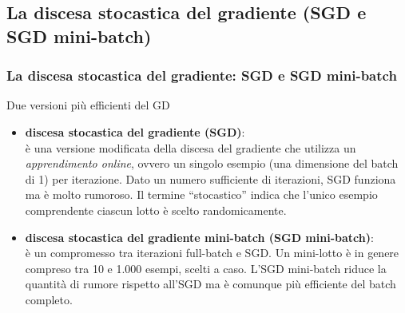 \subsection[La discesa stocastica del gradiente (SGD e SGD mini-batch)]{La discesa stocastica del gradiente (SGD e SGD mini-batch)}
\begin{frame}
	
	\frametitle{La discesa stocastica del gradiente: SGD e SGD mini-batch}
	
	\begin{block}{Due versioni più efficienti del GD} 
	
		\begin{itemize}
			\item \textbf{discesa stocastica del gradiente (SGD)}:\\
				è una versione modificata della discesa del gradiente che utilizza un \textit{apprendimento online}, ovvero un singolo esempio (una dimensione del batch di 1) per iterazione.
				Dato un numero sufficiente di iterazioni, SGD funziona ma è molto rumoroso. Il termine ``stocastico'' indica che l'unico esempio comprendente ciascun lotto è scelto randomicamente.
			\item \textbf{discesa stocastica del gradiente mini-batch (SGD mini-batch)}:\\
				è un compromesso tra iterazioni full-batch e SGD.
				Un mini-lotto è in genere compreso tra 10 e 1.000 esempi, scelti a caso.
				L'SGD mini-batch riduce la quantità di rumore rispetto all'SGD ma è comunque più efficiente del batch completo.
		\end{itemize}
	\end{block}

\end{frame}